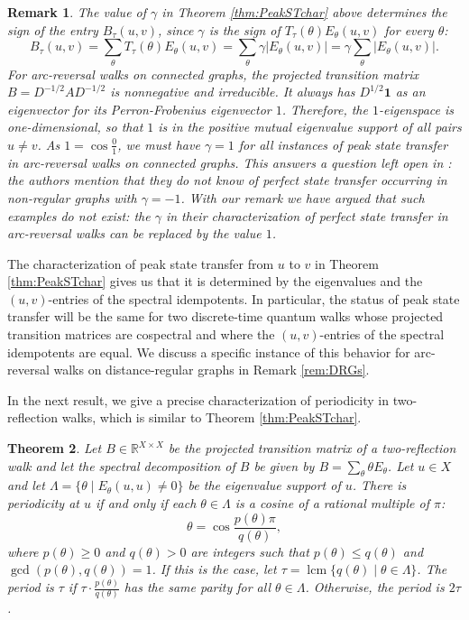 \documentclass{article}
\newtheorem{theorem}{Theorem}[section]
\newtheorem{remark}[theorem]{Remark}
\numberwithin{equation}{section}
\DeclareMathOperator{\lcm}{lcm}
\newcommand\re{{\mathbb R}}%
\newcommand\ones{{\mathbf 1}}
\begin{document}
\begin{remark}
\label{rem:gamma=1}
The value of $\gamma$ in Theorem \ref{thm:PeakSTchar} above determines the sign of the entry $B_{\tau}(u,v)$, since $\gamma$ is the sign of $T_\tau(\theta)E_\theta(u,v)$ for every $\theta$:
\[
B_\tau(u,v) = \sum_\theta T_\tau(\theta)E_\theta(u,v) = \sum_\theta \gamma |E_\theta(u,v)| = \gamma \sum_\theta |E_\theta(u,v)|.
\]
For arc-reversal walks on connected graphs, the projected transition matrix $B = D^{-1/2}AD^{-1/2}$ is nonnegative and irreducible. It always has $D^{1/2} \ones$ as an eigenvector for its Perron-Frobenius eigenvector $1$. Therefore, the $1$-eigenspace is one-dimensional, so that $1$ is in the positive mutual eigenvalue support of all pairs $u \neq v$. As $1 = \cos\frac{0}{1}$, we must have $\gamma = 1$ for all instances of peak state transfer in arc-reversal walks on connected graphs. This answers a question left open in \cite{KubYos2024}: the authors mention that they do not know of perfect state transfer occurring in non-regular graphs with $\gamma = -1$. With our remark we have argued that such examples do not exist: the $\gamma$ in their characterization of perfect state transfer in arc-reversal walks \cite[Theorem 6.5]{KubYos2024} can be replaced by the value $1$.
\end{remark}

The characterization of peak state transfer from $u$ to $v$ in Theorem \ref{thm:PeakSTchar} gives us that it is determined by the eigenvalues and the $(u,v)$-entries of the spectral idempotents. In particular, the status of peak state transfer will be the same for two discrete-time quantum walks whose projected transition matrices are cospectral and where the $(u,v)$-entries of the spectral idempotents are equal. We discuss a specific instance of this behavior for arc-reversal walks on distance-regular graphs in Remark \ref{rem:DRGs}.

In the next result, we give a precise characterization of periodicity in two-reflection walks, which is similar to Theorem \ref{thm:PeakSTchar}. 

\begin{theorem}
\label{thm:periodicity_characterisation}
Let $B \in \re^{X \times X}$ be the projected transition matrix of a two-reflection walk and let the spectral decomposition of $B$ be given by $ B = \sum_{\theta} \theta E_{\theta}$. Let $u \in X$ and let $\Lambda = \{\theta \mid E_{\theta}(u,u) \neq 0\}$ be the eigenvalue support of $u$. There is periodicity at $u$ if and only if each $\theta \in \Lambda$ is a cosine of a rational multiple of $\pi$:
\begin{equation}
\label{eq:periodicity_theta_cosine}
\theta = \cos\frac{p(\theta)\pi}{q(\theta)},
\end{equation}
where $p(\theta) \geq 0$ and $q(\theta) > 0$ are integers such that $p(\theta) \leq q(\theta)$ and $\gcd(p(\theta),q(\theta)) = 1$. If this is the case, let $\tau = \lcm\{q(\theta) \mid \theta \in \Lambda\}$. The period is $\tau$ if $\tau \cdot \frac{p(\theta)}{q(\theta)}$ has the same parity for all $\theta \in \Lambda$. Otherwise, the period is $2\tau$.
\end{theorem}
\end{document}
